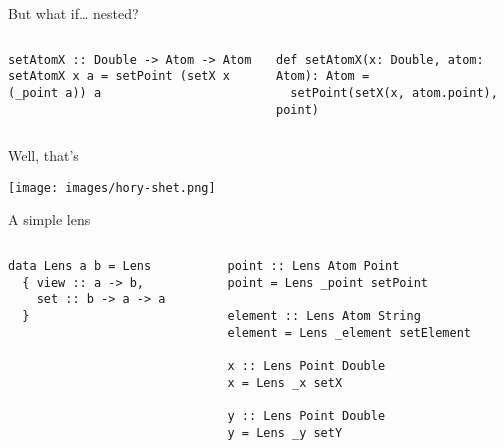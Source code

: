 \documentclass[presentation,aspectratio=169,8pt]{beamer}
\begin{document}
\begin{frame}[label={sec:org5c254c3},fragile]{But what if\ldots{} nested?}
 \begin{columns}
\begin{column}{0.5\columnwidth}
\begin{verbatim}
setAtomX :: Double -> Atom -> Atom
setAtomX x a = setPoint (setX x (_point a)) a
\end{verbatim}
\end{column}

\begin{column}{0.5\columnwidth}
\begin{verbatim}
def setAtomX(x: Double, atom: Atom): Atom =
  setPoint(setX(x, atom.point), point)
\end{verbatim}
\end{column}
\end{columns}
\end{frame}

\begin{frame}[label={sec:org647ed2e}]{Well, that's}
\begin{center}
\texttt{[image: images/hory-shet.png]}
\end{center}
\end{frame}

\begin{frame}[label={sec:org78e8f67},fragile]{A simple lens}
 \begin{columns}
\begin{column}{0.5\columnwidth}
\begin{verbatim}
data Lens a b = Lens
  { view :: a -> b,
    set :: b -> a -> a
  }
\end{verbatim}
\end{column}

\begin{column}{0.5\columnwidth}
\pause

\begin{verbatim}
point :: Lens Atom Point
point = Lens _point setPoint

element :: Lens Atom String
element = Lens _element setElement

x :: Lens Point Double
x = Lens _x setX

y :: Lens Point Double
y = Lens _y setY
\end{verbatim}
\end{column}
\end{columns}
\end{frame}
\end{document}
